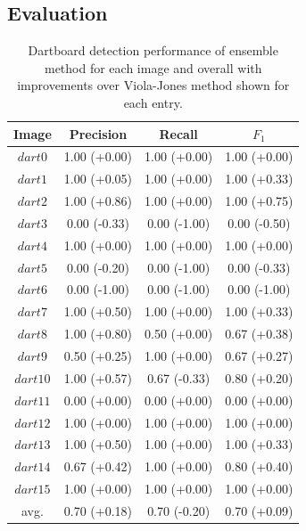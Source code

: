 \documentclass[11pt]{article}
\begin{document}
\subsection{Evaluation}

\begin{table}
\begin{tabular}{|c||c|c|c|} 
    \hline
    Image & Precision & Recall & $F_1$ \\ [0.5ex] 
    \hline
    $dart0$  & 1.00 (+0.00) & 1.00 (+0.00) & 1.00 (+0.00) \\
    $dart1$  & 1.00 (+0.05) & 1.00 (+0.00) & 1.00 (+0.33) \\
    $dart2$  & 1.00 (+0.86) & 1.00 (+0.00) & 1.00 (+0.75) \\
    $dart3$  & 0.00 (-0.33) & 0.00 (-1.00) & 0.00 (-0.50) \\
    $dart4$  & 1.00 (+0.00) & 1.00 (+0.00) & 1.00 (+0.00) \\
    $dart5$  & 0.00 (-0.20) & 0.00 (-1.00) & 0.00 (-0.33) \\
    $dart6$  & 0.00 (-1.00) & 0.00 (-1.00) & 0.00 (-1.00) \\
    $dart7$  & 1.00 (+0.50) & 1.00 (+0.00) & 1.00 (+0.33) \\
    $dart8$  & 1.00 (+0.80) & 0.50 (+0.00) & 0.67 (+0.38) \\
    $dart9$  & 0.50 (+0.25) & 1.00 (+0.00) & 0.67 (+0.27) \\
    $dart10$ & 1.00 (+0.57) & 0.67 (-0.33) & 0.80 (+0.20) \\
    $dart11$ & 0.00 (+0.00) & 0.00 (+0.00) & 0.00 (+0.00) \\
    $dart12$ & 1.00 (+0.00) & 1.00 (+0.00) & 1.00 (+0.00) \\
    $dart13$ & 1.00 (+0.50) & 1.00 (+0.00) & 1.00 (+0.33) \\
    $dart14$ & 0.67 (+0.42) & 1.00 (+0.00) & 0.80 (+0.40) \\
    $dart15$ & 1.00 (+0.00) & 1.00 (+0.00) & 1.00 (+0.00) \\
    \hline\hline
    avg.     & 0.70 (+0.18) & 0.70 (-0.20) & 0.70 (+0.09) \\
    \hline
\end{tabular}
\caption{Dartboard detection performance of ensemble method for each image and overall with improvements over Viola-Jones method shown for each entry.}
\label{ensemble_dartboards_results}
\end{table} 
\end{document}
